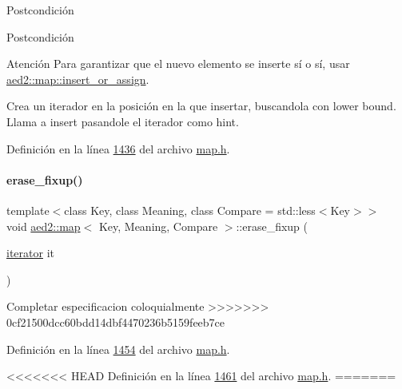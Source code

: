 \begin{DoxyPostcond}{\-Postcondición}
\begin{DoxyPostcond}{\-Postcondición}
\begin{DoxyAttention}{Atención}
Para garantizar que el nuevo elemento se inserte sí o sí, usar \hyperlink{classaed2_1_1map_a2ef6723c183916276b0afc4a4c721475_a2ef6723c183916276b0afc4a4c721475}{aed2\+::map\+::insert\+\_\+or\+\_\+assign}.
\end{DoxyAttention}
Crea un iterador en la posición en la que insertar, buscandola con lower bound. Llama a insert pasandole el iterador como hint. 

Definición en la línea \hyperlink{map_8h_source_l01436}{1436} del archivo \hyperlink{map_8h_source}{map.\+h}.

\mbox{\label{classaed2_1_1map_a7870c8f26e82b00d0aeb2e9f331dfec6_a7870c8f26e82b00d0aeb2e9f331dfec6}} 
\paragraph{\texorpdfstring{erase\+\_\+fixup()}{erase\_fixup()}}
{\footnotesize\ttfamily template$<$class Key, class Meaning, class Compare = std\+::less$<$\+Key$>$$>$ \\
void \hyperlink{classaed2_1_1map}{aed2\+::map}$<$ Key, Meaning, Compare $>$\+::erase\+\_\+fixup (\begin{DoxyParamCaption}\item[{\hyperlink{classaed2_1_1map_1_1iterator}{iterator}}]{it }\end{DoxyParamCaption})\hspace{0.3cm}{\ttfamily [inline]}}

Completar especificacion coloquialmente 
>>>>>>> 0cf21500dcc60bdd14dbf4470236b5159feeb7ce

Definición en la línea \hyperlink{map_8h_source_l01454}{1454} del archivo \hyperlink{map_8h_source}{map.\+h}.

<<<<<<< HEAD
\-Definición en la línea \hyperlink{map_8h_source_l01461}{1461} del archivo \hyperlink{map_8h_source}{map.\-h}.
=======
\mbox{\label{classaed2_1_1map_a2ffadb42cd5f0bc7b3752ff159b75334_a2ffadb42cd5f0bc7b3752ff159b75334}} 

\end{DoxyPostcond}
\end{DoxyPostcond}
